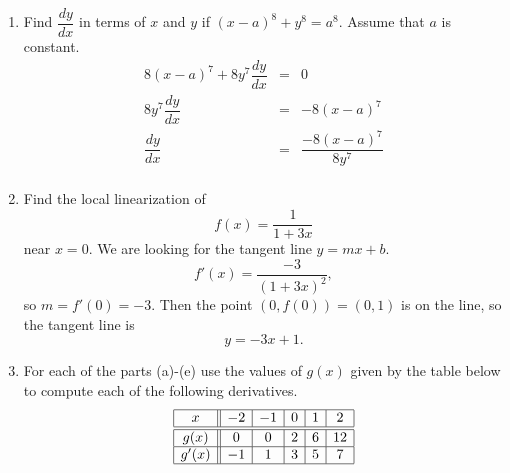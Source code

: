 \documentclass[11pt]{article}
\begin{document}
\begin{enumerate}
\item Find $\dfrac{dy}{dx}$ in terms of $x$ and $y$ if
  $(x-a)^8+y^8=a^8$. Assume that $a$ is constant.
\vfill
\[
\begin{array}{rcl}
  8(x-a)^7+8y^7\dfrac{dy}{dx}&=&0\\
  8y^7\dfrac{dy}{dx}&=&-8(x-a)^7\\
  \dfrac{dy}{dx}&=&\dfrac{-8(x-a)^7}{8y^7}\\  
\end{array}
\]
\vfill

\item Find the local linearization of
  \[
  f(x)=\frac{1}{1+3x}
  \]
  near $x=0$.
\vfill
We are looking for the tangent line $y=mx+b$.
\[
f'(x)=\frac{-3}{(1+3x)^2},
\]
so $m=f'(0)=-3$.  Then the point $(0,f(0))=(0,1)$ is on the line, so
the tangent line is
\[
y=-3x+1.
\]
\vfill
\newpage

\item For each of the parts (a)-(e) use the values of $g(x)$ given by
  the table below to compute each of the following derivatives.
  \[
  \begin{array}{|c||c|c|c|c|c|}
    \hline
    x&-2&-1&0&1&2\\
    \hline
    \hline
    g(x)&0&0&2&6&12\\
    \hline
    g'(x)&-1&1&3&5&7\\
    \hline
  \end{array}
  \]


\end{enumerate}
\end{document}

